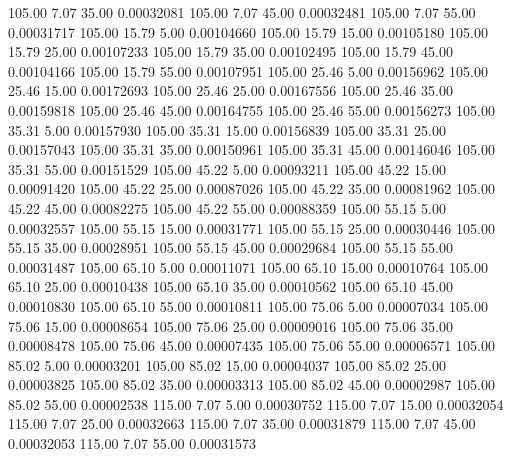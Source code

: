     105.00      7.07     35.00     0.00032081
    105.00      7.07     45.00     0.00032481
    105.00      7.07     55.00     0.00031717
    105.00     15.79      5.00     0.00104660
    105.00     15.79     15.00     0.00105180
    105.00     15.79     25.00     0.00107233
    105.00     15.79     35.00     0.00102495
    105.00     15.79     45.00     0.00104166
    105.00     15.79     55.00     0.00107951
    105.00     25.46      5.00     0.00156962
    105.00     25.46     15.00     0.00172693
    105.00     25.46     25.00     0.00167556
    105.00     25.46     35.00     0.00159818
    105.00     25.46     45.00     0.00164755
    105.00     25.46     55.00     0.00156273
    105.00     35.31      5.00     0.00157930
    105.00     35.31     15.00     0.00156839
    105.00     35.31     25.00     0.00157043
    105.00     35.31     35.00     0.00150961
    105.00     35.31     45.00     0.00146046
    105.00     35.31     55.00     0.00151529
    105.00     45.22      5.00     0.00093211
    105.00     45.22     15.00     0.00091420
    105.00     45.22     25.00     0.00087026
    105.00     45.22     35.00     0.00081962
    105.00     45.22     45.00     0.00082275
    105.00     45.22     55.00     0.00088359
    105.00     55.15      5.00     0.00032557
    105.00     55.15     15.00     0.00031771
    105.00     55.15     25.00     0.00030446
    105.00     55.15     35.00     0.00028951
    105.00     55.15     45.00     0.00029684
    105.00     55.15     55.00     0.00031487
    105.00     65.10      5.00     0.00011071
    105.00     65.10     15.00     0.00010764
    105.00     65.10     25.00     0.00010438
    105.00     65.10     35.00     0.00010562
    105.00     65.10     45.00     0.00010830
    105.00     65.10     55.00     0.00010811
    105.00     75.06      5.00     0.00007034
    105.00     75.06     15.00     0.00008654
    105.00     75.06     25.00     0.00009016
    105.00     75.06     35.00     0.00008478
    105.00     75.06     45.00     0.00007435
    105.00     75.06     55.00     0.00006571
    105.00     85.02      5.00     0.00003201
    105.00     85.02     15.00     0.00004037
    105.00     85.02     25.00     0.00003825
    105.00     85.02     35.00     0.00003313
    105.00     85.02     45.00     0.00002987
    105.00     85.02     55.00     0.00002538
    115.00      7.07      5.00     0.00030752
    115.00      7.07     15.00     0.00032054
    115.00      7.07     25.00     0.00032663
    115.00      7.07     35.00     0.00031879
    115.00      7.07     45.00     0.00032053
    115.00      7.07     55.00     0.00031573
